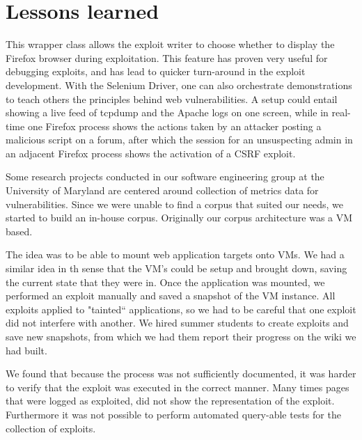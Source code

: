 \documentclass[letterpaper,twocolumn,10pt]{article}
\begin{document}
\section {Lessons learned}

This wrapper class allows the exploit writer to choose whether to display the Firefox browser during exploitation. This feature has proven very useful for debugging exploits, and has lead to quicker turn-around in the exploit development. With the Selenium Driver, one can also orchestrate demonstrations to teach others the principles behind web vulnerabilities.  A setup could entail showing a live feed of tcpdump and the Apache logs on one screen, while in real-time one Firefox process shows the actions taken by an attacker posting a malicious script on a forum, after which the session for an unsuspecting admin in an adjacent Firefox process shows the activation of a CSRF exploit. 

Some research projects conducted in our software engineering group at the University of Maryland are centered around collection of metrics data for vulnerabilities.  Since we were unable to find a corpus that suited our needs, we started to build an in-house corpus.  Originally our corpus architecture was a VM based. \par
The idea was to be able to mount web application targets onto VMs.  We had a similar idea in th sense that the VM's could be setup and brought down, saving the current state that they were in.  Once the application was mounted, we performed an exploit manually and saved a snapshot of the VM instance.  All exploits applied to "tainted`` applications, so we had to be careful that one exploit did not interfere with another.  We hired summer students to create exploits and save new snapshots, from which we had them report their progress on the wiki we had built.\par
We found that because the process was not sufficiently documented, it was harder to verify that the exploit was executed in the correct manner.  Many times pages that were logged as exploited, did not show the representation of the exploit. Furthermore it was not possible to perform automated query-able tests for the collection of exploits.\par
\end{document}

